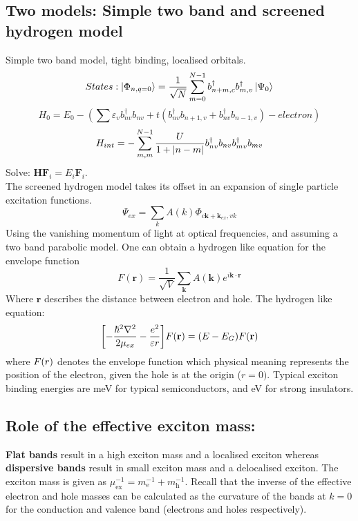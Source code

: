 \documentclass{article}
\begin{document}
\subsection{Two models: Simple two band and screened hydrogen model}
Simple two band model, tight binding, localised orbitals.
\begin{equation}
    States: \ket{\Phi_{n,q=0}} = \dfrac{1}{\sqrt{N}}\sum_{m=0}^{N-1}b_{n+m,c}^{\dagger}b_{m,v}
    ^{\dagger}\ket{\Psi_0}
\end{equation}
\begin{equation}
    H_0 = E_0 -\left(\sum \varepsilon_v b^{\dagger}_{nv}b_{nv} + t(b^{\dagger}_{nv}b_{n+1,v} + b^{\dagger}_{nv}b_{n-1,v}) - electron\right)
\end{equation}
\begin{equation}
    H_{int} = - \sum_{m,m}^{N-1}\dfrac{U}{1+\abs{n-m}}b^{\dagger}_{nv}b_{nv}b^{\dagger}_{mv}b_{mv}
\end{equation}
Solve: $\mathbf{H}\mathbf{F}_i = E_i \mathbf{F}_i$.\\
The screened hydrogen model takes its offset in an expansion of single particle excitation functions.
\begin{equation}
    \Psi_{ex} = \sum_k A(k) \Phi_{c \mathbf{k}+\mathbf{k}_{ex},vk}
\end{equation}
Using the vanishing momentum of light at optical frequencies, and assuming a two band parabolic model. One can obtain a hydrogen like equation for the envelope function
\begin{equation}
    F(\mathbf{r}) = \frac{1}{\sqrt{V}} \sum_{\mathbf{k}} A(\mathbf{k}) e^{i \mathbf{k} \cdot \mathbf{r}}
\end{equation}
Where $\mathbf{r}$ describes the distance between electron and hole.
The hydrogen like equation:
\begin{equation}
    \qty[-\frac{\hbar^2 \nabla^2}{2 \mu_{ex}}-\frac{e^2}{\varepsilon r}] F(\mathbf{r}) = (E-E_G)F(\mathbf{r})
\end{equation}
where $F\qty(r)$ denotes the envelope function which physical meaning represents the position of the electron, given the hole is at the origin ($r=0)$. Typical exciton binding energies are meV for typical semiconductors, and eV for strong insulators.

\subsection{Role of the effective exciton mass:}
\textbf{Flat bands} result in a high exciton mass and a localised exciton whereas \textbf{dispersive bands} result in small exciton mass and a delocalised exciton. The exciton mass is given as $\mu_{\mathrm{ex}}^{-1} = m_{\mathrm{e}}^{-1} + m_{\mathrm{h}}^{-1}$. Recall that the inverse of the effective electron and hole masses can be calculated as the curvature of the bands at $k=0$ for the conduction and valence band (electrons and holes respectively).
\end{document}
